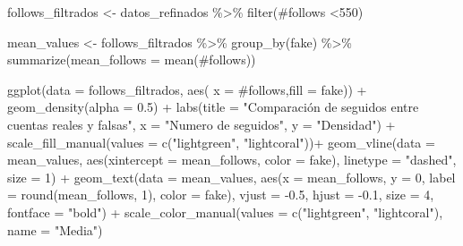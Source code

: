 \documentclass[
  letterpaper,
  DIV=11,
  numbers=noendperiod]{scrreprt}
\newenvironment{Shaded}{\begin{snugshade}}{\end{snugshade}}
\newcommand{\AttributeTok}[1]{\textcolor[rgb]{0.40,0.45,0.13}{#1}}
\newcommand{\DecValTok}[1]{\textcolor[rgb]{0.68,0.00,0.00}{#1}}
\newcommand{\FloatTok}[1]{\textcolor[rgb]{0.68,0.00,0.00}{#1}}
\newcommand{\FunctionTok}[1]{\textcolor[rgb]{0.28,0.35,0.67}{#1}}
\newcommand{\NormalTok}[1]{\textcolor[rgb]{0.00,0.23,0.31}{#1}}
\newcommand{\OtherTok}[1]{\textcolor[rgb]{0.00,0.23,0.31}{#1}}
\newcommand{\SpecialCharTok}[1]{\textcolor[rgb]{0.37,0.37,0.37}{#1}}
\newcommand{\StringTok}[1]{\textcolor[rgb]{0.13,0.47,0.30}{#1}}
\begin{document}
\begin{Shaded}
\begin{Highlighting}[]
\NormalTok{follows\_filtrados }\OtherTok{\textless{}{-}}\NormalTok{ datos\_refinados }\SpecialCharTok{\%\textgreater{}\%}  \FunctionTok{filter}\NormalTok{(}\StringTok{\textasciigrave{}}\AttributeTok{\#follows}\StringTok{\textasciigrave{}} \SpecialCharTok{\textless{}}\DecValTok{550}\NormalTok{)  }

\NormalTok{mean\_values }\OtherTok{\textless{}{-}}\NormalTok{ follows\_filtrados }\SpecialCharTok{\%\textgreater{}\%} 
  \FunctionTok{group\_by}\NormalTok{(fake) }\SpecialCharTok{\%\textgreater{}\%} 
  \FunctionTok{summarize}\NormalTok{(}\AttributeTok{mean\_follows =} \FunctionTok{mean}\NormalTok{(}\StringTok{\textasciigrave{}}\AttributeTok{\#follows}\StringTok{\textasciigrave{}}\NormalTok{))}

\FunctionTok{ggplot}\NormalTok{(}\AttributeTok{data =}\NormalTok{ follows\_filtrados, }\FunctionTok{aes}\NormalTok{( }\AttributeTok{x =} \StringTok{\textasciigrave{}}\AttributeTok{\#follows}\StringTok{\textasciigrave{}}\NormalTok{,}\AttributeTok{fill =} \StringTok{\textasciigrave{}}\AttributeTok{fake}\StringTok{\textasciigrave{}}\NormalTok{)) }\SpecialCharTok{+}   \FunctionTok{geom\_density}\NormalTok{(}\AttributeTok{alpha =} \FloatTok{0.5}\NormalTok{) }\SpecialCharTok{+}   
  \FunctionTok{labs}\NormalTok{(}\AttributeTok{title =} \StringTok{"Comparación de seguidos entre cuentas reales y falsas"}\NormalTok{,        }
       \AttributeTok{x =} \StringTok{"Numero de seguidos"}\NormalTok{,        }
       \AttributeTok{y =} \StringTok{"Densidad"}\NormalTok{) }\SpecialCharTok{+}   
  \FunctionTok{scale\_fill\_manual}\NormalTok{(}\AttributeTok{values =} \FunctionTok{c}\NormalTok{(}\StringTok{"lightgreen"}\NormalTok{, }\StringTok{"lightcoral"}\NormalTok{))}\SpecialCharTok{+}
  \FunctionTok{geom\_vline}\NormalTok{(}\AttributeTok{data =}\NormalTok{ mean\_values, }\FunctionTok{aes}\NormalTok{(}\AttributeTok{xintercept =}\NormalTok{ mean\_follows, }\AttributeTok{color =}\NormalTok{ fake), }\AttributeTok{linetype =} \StringTok{"dashed"}\NormalTok{, }\AttributeTok{size =} \DecValTok{1}\NormalTok{) }\SpecialCharTok{+}
   \FunctionTok{geom\_text}\NormalTok{(}\AttributeTok{data =}\NormalTok{ mean\_values, }\FunctionTok{aes}\NormalTok{(}\AttributeTok{x =}\NormalTok{ mean\_follows, }\AttributeTok{y =} \DecValTok{0}\NormalTok{, }\AttributeTok{label =} \FunctionTok{round}\NormalTok{(mean\_follows, }\DecValTok{1}\NormalTok{), }\AttributeTok{color =}\NormalTok{ fake),}
            \AttributeTok{vjust =} \SpecialCharTok{{-}}\FloatTok{0.5}\NormalTok{, }\AttributeTok{hjust =} \SpecialCharTok{{-}}\FloatTok{0.1}\NormalTok{, }\AttributeTok{size =} \DecValTok{4}\NormalTok{, }\AttributeTok{fontface =} \StringTok{"bold"}\NormalTok{) }\SpecialCharTok{+}
  \FunctionTok{scale\_color\_manual}\NormalTok{(}\AttributeTok{values =} \FunctionTok{c}\NormalTok{(}\StringTok{"lightgreen"}\NormalTok{, }\StringTok{"lightcoral"}\NormalTok{), }\AttributeTok{name =} \StringTok{"Media"}\NormalTok{)}
\end{Highlighting}
\end{Shaded}
\end{document}
